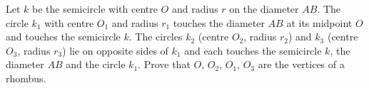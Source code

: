 Let $k$ be the semicircle with centre $O$ and radius $r$ on the diameter $AB$. The circle $k_1$ with centre $O_1$ and radius $r_1$ touches the diameter $AB$ at its midpoint $O$ and touches the semicircle $k$. The circles $k_2$ (centre $O_2$, radius $r_2$) and $k_3$ (centre $O_3$, radius $r_3$) lie on opposite sides of $k_1$ and each touches the semicircle $k$, the diameter $AB$ and the circle $k_1$. Prove that $O$, $O_2$, $O_1$, $O_3$ are the vertices of a rhombus.
